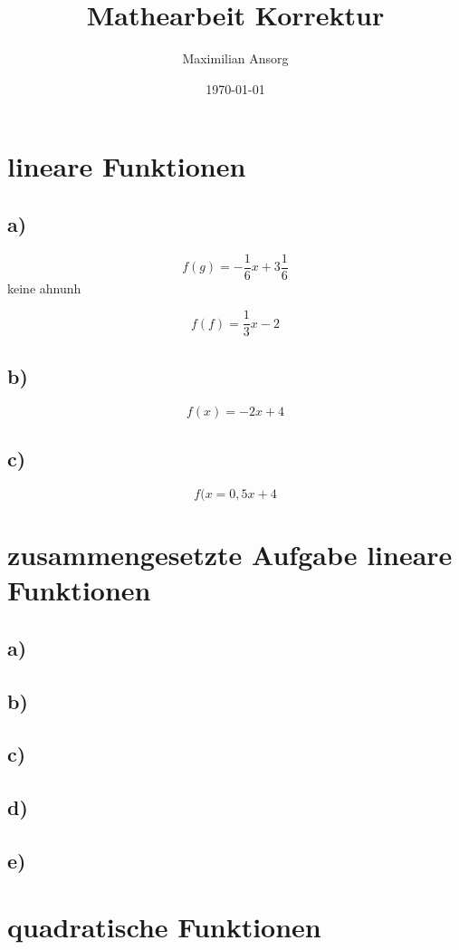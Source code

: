 \documentclass[a4paper,12pt]{scrartcl}
\title{Mathearbeit Korrektur}
\author{Maximilian Ansorg}
\date{\today}
\begin{document}
\maketitle

\section{lineare Funktionen}

\subsection*{a)}

\[f(g)=-\frac{1}{6}x+3\frac{1}{6}\]
keine ahnunh

\[f(f)=\frac{1}{3}x-2\]

\subsection*{b)}

\[f(x)=-2x+4\]

\subsection*{c)}

\[f(x=0,5x+4\]

\section{zusammengesetzte Aufgabe lineare Funktionen}

\subsection*{a)}
\subsection*{b)}
\subsection*{c)}
\subsection*{d)}
\subsection*{e)}

\section{quadratische Funktionen}
\end{document}
